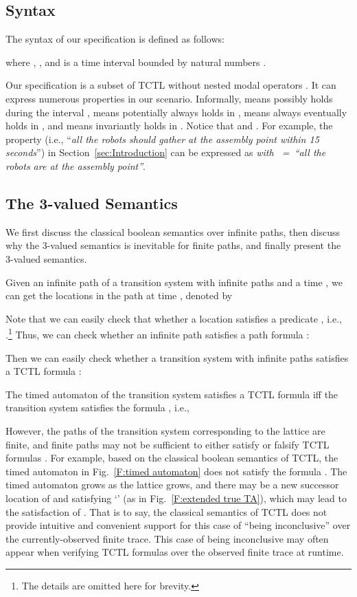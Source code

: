 \documentclass[10pt,conference,compsocconf,letterpaper]{IEEEtran}
\begin{document}
\subsection{Syntax}

The syntax of our specification is defined as follows:

where , , and  is a time interval bounded by natural numbers \cite{Baier08}.

Our specification is a subset of TCTL without nested modal operators \cite{Behrmann04}. It can express numerous properties in our scenario. Informally,  means  possibly holds during the interval ,  means  potentially always holds in ,  means  always eventually holds in , and  means  invariantly holds in . Notice that  and . For example, the property  (i.e., ``\textit{all the robots should gather at the assembly point within 15 seconds}'') in Section~\ref{sec:Introduction} can be expressed as \textit{ with ~=~``all the robots are at the assembly point''}.

\subsection{The 3-valued Semantics}\label{sec:Semantics}

We first discuss the classical boolean semantics over infinite paths, then discuss why the 3-valued semantics is inevitable for finite paths, and finally present the 3-valued semantics.

Given an infinite path  of a transition system  with infinite paths and a time , we can get the locations in the path at time , denoted by

Note that we can easily check that whether a location  satisfies a predicate , i.e., .\footnote{The details are omitted here for brevity.} Thus, we can check whether an infinite path  satisfies a path formula :

Then we can easily check whether a transition system  with infinite paths satisfies a TCTL formula :

The timed automaton  of the transition system  satisfies a TCTL formula  iff the transition system  satisfies the formula  \cite{Baier08}, i.e.,


However, the paths of the transition system corresponding to the lattice are finite, and finite paths may not be sufficient to either satisfy or falsify TCTL formulas \cite{Bauer11, Wei12}. For example, based on the classical boolean semantics of TCTL, the timed automaton in Fig.~\ref{F:timed automaton} does not satisfy the formula . The timed automaton grows as the lattice grows, and there may be a new successor location of  and  satisfying `' (as in Fig.~\ref{F:extended true TA}), which may lead to the satisfaction of . That is to say, the classical semantics of TCTL does not provide intuitive and convenient support for this case of ``being inconclusive'' over the currently-observed finite trace. This case of being inconclusive may often appear when verifying TCTL formulas over the observed finite trace at runtime.
\end{document}
